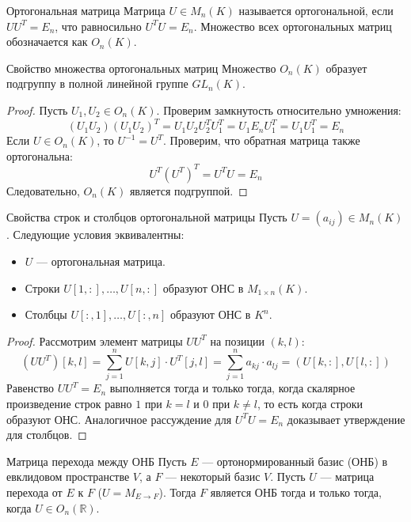 \begin{Definition}{Ортогональная матрица}{}
	Матрица $U \in M_n(K)$ называется ортогональной, если $U U^T = E_n$, что равносильно $U^T U = E_n$.
	Множество всех ортогональных матриц обозначается как $O_n(K)$.
\end{Definition}

\begin{Lemma}{Свойство множества ортогональных матриц}{}
	Множество $O_n(K)$ образует подгруппу в полной линейной группе $GL_n(K)$.
\end{Lemma}

\begin{proof}
	Пусть $U_1, U_2 \in O_n(K)$. Проверим замкнутость относительно умножения:
	\[
	(U_1 U_2)(U_1 U_2)^T = U_1 U_2 U_2^T U_1^T = U_1 E_n U_1^T = U_1 U_1^T = E_n
	\]
	Если $U \in O_n(K)$, то $U^{-1} = U^T$. Проверим, что обратная матрица также ортогональна:
	\[
	U^T (U^T)^T = U^T U = E_n
	\]
	Следовательно, $O_n(K)$ является подгруппой.
\end{proof}

\begin{Proposition}{Свойства строк и столбцов ортогональной матрицы}{}
	Пусть $U = (a_{ij}) \in M_n(K)$. Следующие условия эквивалентны:
	\begin{itemize}
		\item $U$ — ортогональная матрица.
		\item Строки $U[1, :], \dots, U[n, :]$ образуют ОНС в $M_{1 \times n}(K)$.
		\item Столбцы $U[:, 1], \dots, U[:, n]$ образуют ОНС в $K^n$.
	\end{itemize}
\end{Proposition}

\begin{proof}
	Рассмотрим элемент матрицы $U U^T$ на позиции $(k, l)$:
	\[
	(U U^T)[k, l] = \sum_{j=1}^n U[k, j] \cdot U^T[j, l] = \sum_{j=1}^n a_{kj} \cdot a_{lj} = (U[k, :], U[l, :])
	\]
	Равенство $U U^T = E_n$ выполняется тогда и только тогда, когда скалярное произведение строк равно $1$ при $k=l$ и $0$ при $k \neq l$, то есть когда строки образуют ОНС. Аналогичное рассуждение для $U^T U = E_n$ доказывает утверждение для столбцов.
\end{proof}

\begin{Proposition}{Матрица перехода между ОНБ}{}
	Пусть $E$ — ортонормированный базис (ОНБ) в евклидовом пространстве $V$, а $F$ — некоторый базис $V$. Пусть $U$ — матрица перехода от $E$ к $F$ ($U = M_{E \to F}$). Тогда $F$ является ОНБ тогда и только тогда, когда $U \in O_n(\mathbb{R})$.
\end{Proposition}

